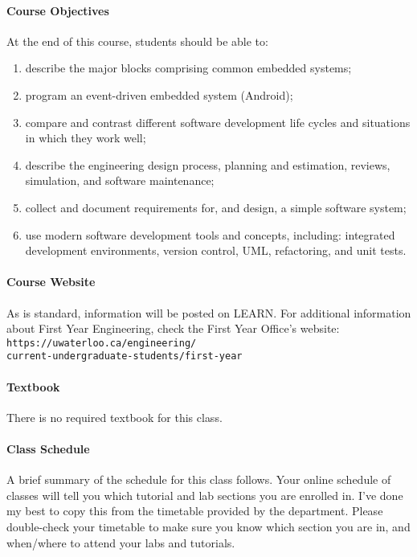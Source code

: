 \documentclass[letterpaper,10pt]{article}
\begin{document}
\paragraph{Course Objectives} At the end of this course, students should be able to:
\begin{enumerate}
\itemsep0em
        \item describe the major blocks comprising common embedded systems;
        \item program an event-driven embedded system (Android);
        \item compare and contrast different software development life cycles and situations in which they work well;
        \item describe the engineering design process, planning and estimation, reviews, simulation, and software maintenance;
        \item collect and document requirements for, and design, a simple software system;
        \item use modern software development tools and concepts, including: integrated development environments, version control, UML, refactoring, and unit tests.
\end{enumerate}

\paragraph{Course Website} As is standard, information will be posted on LEARN.
For additional information about First Year Engineering, check the First Year Office's website:
\texttt{https://uwaterloo.ca/engineering/\\current-undergraduate-students/first-year}


\paragraph{Textbook} There is no required textbook for this class.



\paragraph{Class Schedule}

A brief summary of the schedule for this class follows. Your online schedule of classes will tell you which tutorial and lab sections you are enrolled in. I've done my best to copy this from the timetable provided by the department. Please double-check your timetable to make sure you know which section you are in, and when/where to attend your labs and tutorials.
\end{document}
